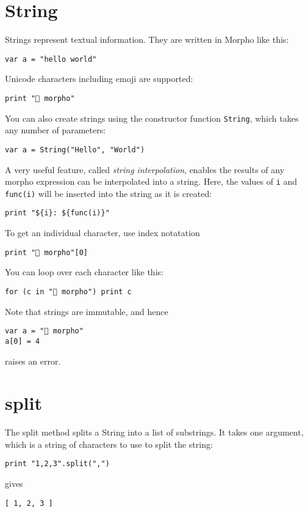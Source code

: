 \hypertarget{string}{%
\section{String}\label{string}}

Strings represent textual information. They are written in Morpho like
this:

\begin{lstlisting}
var a = "hello world"
\end{lstlisting}

Unicode characters including emoji are supported:

\begin{lstlisting}
print "🦋 morpho"
\end{lstlisting}

You can also create strings using the constructor function
\texttt{String}, which takes any number of parameters:

\begin{lstlisting}
var a = String("Hello", "World")
\end{lstlisting}

A very useful feature, called \emph{string interpolation}, enables the
results of any morpho expression can be interpolated into a string.
Here, the values of \texttt{i} and \texttt{func(i)} will be inserted
into the string as it is created:

\begin{lstlisting}
print "${i}: ${func(i)}"
\end{lstlisting}

To get an individual character, use index notatation

\begin{lstlisting}
print "🦋 morpho"[0]
\end{lstlisting}

You can loop over each character like this:

\begin{lstlisting}
for (c in "🦋 morpho") print c
\end{lstlisting}

Note that strings are immutable, and hence

\begin{lstlisting}
var a = "🦋 morpho"
a[0] = 4
\end{lstlisting}

raises an error.

\hypertarget{split}{%
\section{split}\label{split}}

The split method splits a String into a list of substrings. It takes one
argument, which is a string of characters to use to split the string:

\begin{lstlisting}
print "1,2,3".split(",")
\end{lstlisting}

gives

\begin{lstlisting}
[ 1, 2, 3 ]
\end{lstlisting}

